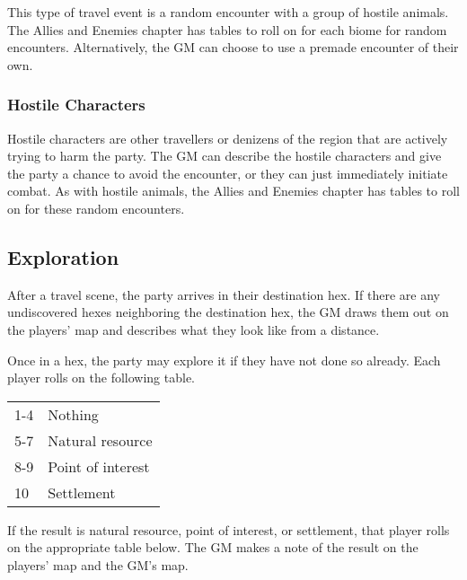 \begin{multicols}{2}
This type of travel event is a random encounter with a group of hostile animals. The
Allies and Enemies chapter has tables to roll on for each biome for random encounters.
Alternatively, the GM can choose to use a premade encounter of their own.

\subsubsection{Hostile Characters}

Hostile characters are other travellers or denizens of the region that are actively
trying to harm the party. The GM can describe the hostile characters and give the
party a chance to avoid the encounter, or they can just immediately initiate combat.
As with hostile animals, the Allies and Enemies chapter has tables to roll on for
these random encounters.

\subsection{Exploration}

After a travel scene, the party arrives in their destination hex. If there are any
undiscovered hexes neighboring the destination hex, the GM draws them out on the
players' map and describes what they look like from a distance.

Once in a hex, the party may explore it if they have not done so already. Each player
rolls on the following table.

\begin{center}
{
\begin{xtabular}{|l|l|}
1-4 & Nothing \\
5-7 & Natural resource \\
8-9 & Point of interest \\
10 & Settlement \\
\hline
\end{xtabular}
}
\end{center}

If the result is natural resource, point of interest, or settlement, that player
rolls on the appropriate table below. The GM makes a note of the result on the
players' map and the GM's map.


\end{multicols}
